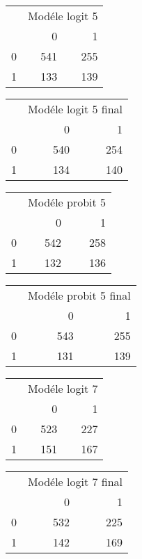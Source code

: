 \documentclass[
  14pt,
  french,
]{article}
\begin{document}
\begin{center}

\begin{tabular}{l|r|r}
\hline
\multicolumn{1}{c|}{ } & \multicolumn{2}{c}{Modéle logit 5 } \\
\cline{2-3}
  & 0 & 1\\
\hline
0 & 541 & 255\\
\hline
1 & 133 & 139\\
\hline
\end{tabular}


\begin{tabular}{l|r|r}
\hline
\multicolumn{1}{c|}{ } & \multicolumn{2}{c}{Modéle logit 5 final } \\
\cline{2-3}
  & 0 & 1\\
\hline
0 & 540 & 254\\
\hline
1 & 134 & 140\\
\hline
\end{tabular}


\begin{tabular}{l|r|r}
\hline
\multicolumn{1}{c|}{ } & \multicolumn{2}{c}{Modéle probit 5 } \\
\cline{2-3}
  & 0 & 1\\
\hline
0 & 542 & 258\\
\hline
1 & 132 & 136\\
\hline
\end{tabular}


\begin{tabular}{l|r|r}
\hline
\multicolumn{1}{c|}{ } & \multicolumn{2}{c}{Modéle probit 5 final } \\
\cline{2-3}
  & 0 & 1\\
\hline
0 & 543 & 255\\
\hline
1 & 131 & 139\\
\hline
\end{tabular}


\begin{tabular}{l|r|r}
\hline
\multicolumn{1}{c|}{ } & \multicolumn{2}{c}{Modéle logit 7 } \\
\cline{2-3}
  & 0 & 1\\
\hline
0 & 523 & 227\\
\hline
1 & 151 & 167\\
\hline
\end{tabular}


\begin{tabular}{l|r|r}
\hline
\multicolumn{1}{c|}{ } & \multicolumn{2}{c}{Modéle logit 7 final } \\
\cline{2-3}
  & 0 & 1\\
\hline
0 & 532 & 225\\
\hline
1 & 142 & 169\\
\hline
\end{tabular}



\end{center}
\end{document}
